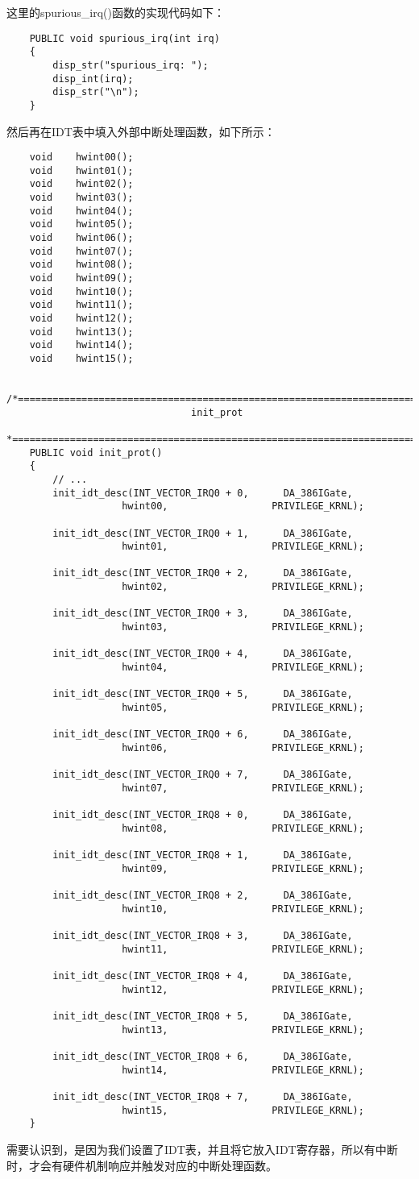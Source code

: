 \documentclass[a4paper,left=2.5cm,right=2.5cm,11pt]{article}
\begin{document}
	这里的spurious\_irq()函数的实现代码如下：
	\begin{lstlisting}
	PUBLIC void spurious_irq(int irq)
	{
		disp_str("spurious_irq: ");
		disp_int(irq);
		disp_str("\n");
	}
	\end{lstlisting}

	然后再在IDT表中填入外部中断处理函数，如下所示：
	\begin{lstlisting}
	void    hwint00();
	void    hwint01();
	void    hwint02();
	void    hwint03();
	void    hwint04();
	void    hwint05();
	void    hwint06();
	void    hwint07();
	void    hwint08();
	void    hwint09();
	void    hwint10();
	void    hwint11();
	void    hwint12();
	void    hwint13();
	void    hwint14();
	void    hwint15();

	/*======================================================================*
								init_prot
	*======================================================================*/
	PUBLIC void init_prot()
	{
		// ...
		init_idt_desc(INT_VECTOR_IRQ0 + 0,      DA_386IGate,
					hwint00,                  PRIVILEGE_KRNL);

		init_idt_desc(INT_VECTOR_IRQ0 + 1,      DA_386IGate,
					hwint01,                  PRIVILEGE_KRNL);

		init_idt_desc(INT_VECTOR_IRQ0 + 2,      DA_386IGate,
					hwint02,                  PRIVILEGE_KRNL);

		init_idt_desc(INT_VECTOR_IRQ0 + 3,      DA_386IGate,
					hwint03,                  PRIVILEGE_KRNL);

		init_idt_desc(INT_VECTOR_IRQ0 + 4,      DA_386IGate,
					hwint04,                  PRIVILEGE_KRNL);

		init_idt_desc(INT_VECTOR_IRQ0 + 5,      DA_386IGate,
					hwint05,                  PRIVILEGE_KRNL);

		init_idt_desc(INT_VECTOR_IRQ0 + 6,      DA_386IGate,
					hwint06,                  PRIVILEGE_KRNL);

		init_idt_desc(INT_VECTOR_IRQ0 + 7,      DA_386IGate,
					hwint07,                  PRIVILEGE_KRNL);

		init_idt_desc(INT_VECTOR_IRQ8 + 0,      DA_386IGate,
					hwint08,                  PRIVILEGE_KRNL);

		init_idt_desc(INT_VECTOR_IRQ8 + 1,      DA_386IGate,
					hwint09,                  PRIVILEGE_KRNL);

		init_idt_desc(INT_VECTOR_IRQ8 + 2,      DA_386IGate,
					hwint10,                  PRIVILEGE_KRNL);

		init_idt_desc(INT_VECTOR_IRQ8 + 3,      DA_386IGate,
					hwint11,                  PRIVILEGE_KRNL);

		init_idt_desc(INT_VECTOR_IRQ8 + 4,      DA_386IGate,
					hwint12,                  PRIVILEGE_KRNL);

		init_idt_desc(INT_VECTOR_IRQ8 + 5,      DA_386IGate,
					hwint13,                  PRIVILEGE_KRNL);

		init_idt_desc(INT_VECTOR_IRQ8 + 6,      DA_386IGate,
					hwint14,                  PRIVILEGE_KRNL);

		init_idt_desc(INT_VECTOR_IRQ8 + 7,      DA_386IGate,
					hwint15,                  PRIVILEGE_KRNL);
	}
	\end{lstlisting}

	需要认识到，是因为我们设置了IDT表，并且将它放入IDT寄存器，所以有中断时，才会有硬件机制响应并触发对应的中断处理函数。
\end{document}
